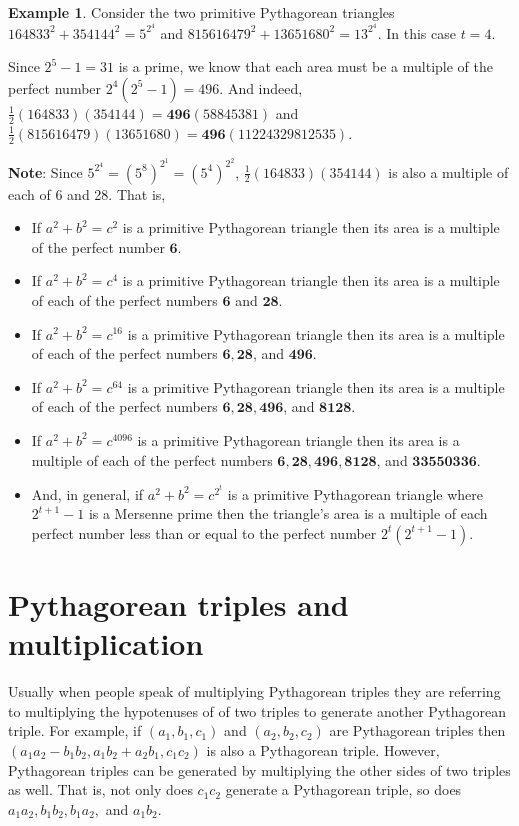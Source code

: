 \documentclass{article}
\theoremstyle{definition}
\newtheorem{example}{Example}[section]
\begin{document}
\begin{example}
Consider the two primitive Pythagorean triangles \(164833^2+354144^2 = 5^{2^4}\) and \(815616479^2 + 13651680^2 = 13^{2^4}\). In this case \(t=4\).

Since \(2^5-1=31\) is a prime, we know that each area must be a multiple of the perfect number \(2^4 (2^5-1) = 496\). And indeed, \(\frac{1}{2} (164833)(354144) = \mathbf{496} (58845381)\) and \(\frac{1}{2} (815616479)(13651680) = \mathbf{496} (11224329812535)\).

\bigskip

\textbf{Note}: Since \(5^{2^4} = (5^8)^{2^1} = (5^4)^{2^2}\), \(\frac{1}{2}(164833)(354144)\) is also a multiple of each of 6 and 28. That is,
\end{example}
\begin{itemize}
\item If \(a^2+b^2=c^2\) is a primitive Pythagorean triangle then its area is a multiple of the perfect number \(\mathbf{6}\). 
\item If \(a^2+b^2=c^4\) is a primitive Pythagorean triangle then its area is a multiple of each of the perfect numbers \(\mathbf{6}\) and \(\mathbf{28}\). 
\item If \(a^2+b^2=c^{16}\) is a primitive Pythagorean triangle then its area is a multiple of each of the perfect numbers \(\mathbf{6}, \mathbf{28}\), and \(\mathbf{496}\). 
\item If \(a^2+b^2=c^{64}\) is a primitive Pythagorean triangle then its area is a multiple of each of the perfect numbers \(\mathbf{6}, \mathbf{28}, \mathbf{496}\), and \(\mathbf{8128}\). 
\item If \(a^2+b^2=c^{4096}\) is a primitive Pythagorean triangle then its area is a multiple of each of the perfect numbers \(\mathbf{6}, \mathbf{28}, \mathbf{496}, \mathbf{8128}\), and \(\mathbf{33550336}\). 
\item And, in general, if  \(a^2+b^2=c^{2^t}\) is a primitive Pythagorean triangle where \(2^{t+1}-1\) is a Mersenne prime then the triangle's area is a multiple of each perfect number less than or equal to the perfect number \(2^t(2^{t+1}-1)\).
\end{itemize}

\section{Pythagorean triples and multiplication}

Usually when people speak of multiplying Pythagorean triples they are referring to multiplying the hypotenuses of of two triples to generate another Pythagorean triple. For example, if \((a_1,b_1,c_1)\) and \((a_2,b_2,c_2)\) are Pythagorean triples then \((a_1a_2 - b_1b_2, a_1b_2 + a_2b_1, c_1c_2)\) is also a Pythagorean triple. However, Pythagorean triples can be generated by multiplying the other sides of two triples as well. That is, not only does \(c_1c_2\) generate a Pythagorean triple, so does \(a_1a_2, b_1b_2, b_1a_2,\) and \(a_1b_2\).
\end{document}

